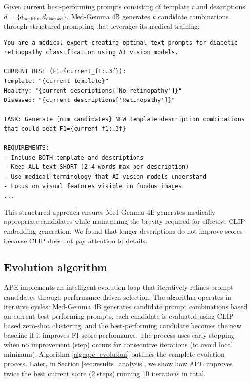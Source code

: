 \documentclass[pdflatex,sn-mathphys-num]{sn-jnl}%
\theoremstyle{thmstyleone}%
\theoremstyle{thmstyletwo}%
\theoremstyle{thmstylethree}%
\begin{document}
Given current best-performing prompts consisting of template $t$ and descriptions $d = \{d_{\text{healthy}}, d_{\text{diseased}}\}$, Med-Gemma 4B generates $k$ candidate combinations through structured prompting that leverages its medical training:

\begin{tcolorbox}[colback=blue!5!white, colframe=blue!75!black, title=\textbf{Med-Gemma 4B prompt}]
\begin{small}
\begin{verbatim}
You are a medical expert creating optimal text prompts for diabetic 
retinopathy classification using AI vision models.

CURRENT BEST (F1={current_f1:.3f}):
Template: "{current_template}"
Healthy: "{current_descriptions['No retinopathy']}"  
Diseased: "{current_descriptions['Retinopathy']}"

TASK: Generate {num_candidates} NEW template+description combinations 
that could beat F1={current_f1:.3f}

REQUIREMENTS:
- Include BOTH template and descriptions
- Keep ALL text SHORT (2-4 words max per description)  
- Use medical terminology that AI vision models understand
- Focus on visual features visible in fundus images
...
\end{verbatim}
\end{small}
\end{tcolorbox}

This structured approach ensures Med-Gemma 4B generates medically appropriate candidates while maintaining the brevity required for effective CLIP embedding generation. We found that longer descriptions do not improve scores because CLIP does not pay attention to details.

\subsection{Evolution algorithm}
APE implements an intelligent evolution loop that iteratively refines prompt candidates through performance-driven selection. The algorithm operates in iterative cycles: Med-Gemma 4B generates candidate prompt combinations based on current best-performing prompts, each candidate is evaluated using CLIP-based zero-shot clustering, and the best-performing candidate becomes the new baseline if it improves F1-score performance. The process uses early stopping when no improvement (step) occurs for consecutive iterations (to avoid local minimum).  Algorithm \ref{alg:ape_evolution} outlines the complete evolution process. Later, in Section \ref{sec:results_analysis}, we show how APE improves twice the best current score (2 steps) running 10 iterations in total.
\end{document}
